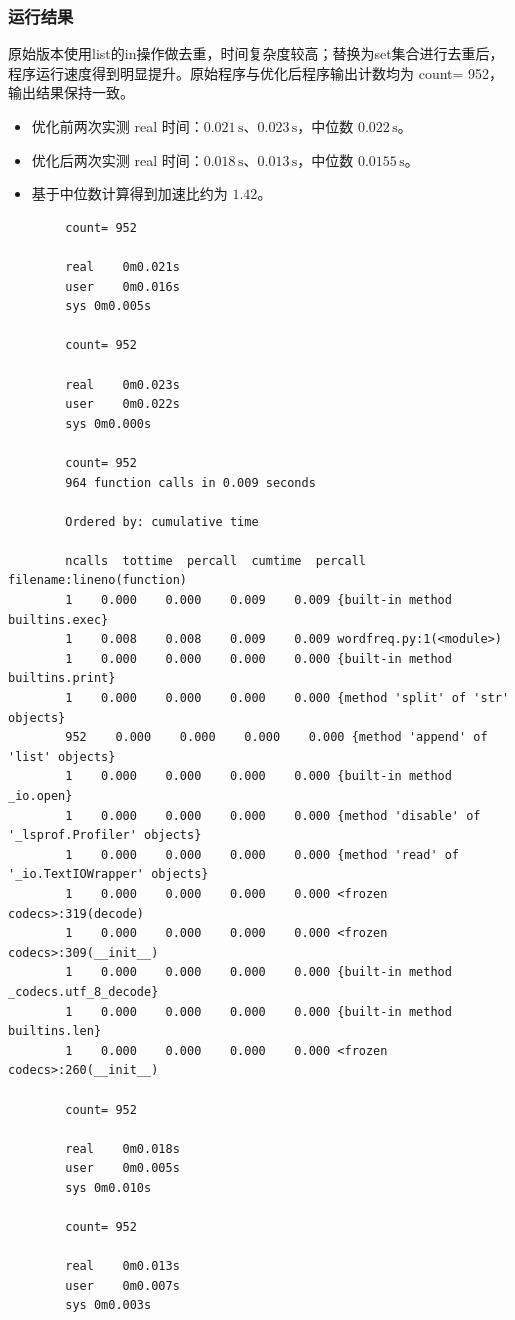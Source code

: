 \documentclass[a4paper,12pt]{ctexart}
\begin{document}
	\subsubsection{运行结果}
	 原始版本使用list的in操作做去重，时间复杂度较高；替换为set集合进行去重后，程序运行速度得到明显提升。原始程序与优化后程序输出计数均为 count= 952，输出结果保持一致。
	
	\begin{itemize}
		\item 优化前两次实测 real 时间：$0.021\,\text{s}$、$0.023\,\text{s}$，中位数 $0.022\,\text{s}$。
		\item 优化后两次实测 real 时间：$0.018\,\text{s}$、$0.013\,\text{s}$，中位数 $0.0155\,\text{s}$。
		\item 基于中位数计算得到加速比约为 $1.42$。
	\end{itemize}
	\begin{lstlisting}
		count= 952
		
		real	0m0.021s
		user	0m0.016s
		sys	0m0.005s
		
		count= 952
		
		real	0m0.023s
		user	0m0.022s
		sys	0m0.000s
		
		count= 952
		964 function calls in 0.009 seconds
		
		Ordered by: cumulative time
		
		ncalls  tottime  percall  cumtime  percall filename:lineno(function)
		1    0.000    0.000    0.009    0.009 {built-in method builtins.exec}
		1    0.008    0.008    0.009    0.009 wordfreq.py:1(<module>)
		1    0.000    0.000    0.000    0.000 {built-in method builtins.print}
		1    0.000    0.000    0.000    0.000 {method 'split' of 'str' objects}
		952    0.000    0.000    0.000    0.000 {method 'append' of 'list' objects}
		1    0.000    0.000    0.000    0.000 {built-in method _io.open}
		1    0.000    0.000    0.000    0.000 {method 'disable' of '_lsprof.Profiler' objects}
		1    0.000    0.000    0.000    0.000 {method 'read' of '_io.TextIOWrapper' objects}
		1    0.000    0.000    0.000    0.000 <frozen codecs>:319(decode)
		1    0.000    0.000    0.000    0.000 <frozen codecs>:309(__init__)
		1    0.000    0.000    0.000    0.000 {built-in method _codecs.utf_8_decode}
		1    0.000    0.000    0.000    0.000 {built-in method builtins.len}
		1    0.000    0.000    0.000    0.000 <frozen codecs>:260(__init__)
		
		count= 952
		
		real	0m0.018s
		user	0m0.005s
		sys	0m0.010s
		
		count= 952
		
		real	0m0.013s
		user	0m0.007s
		sys	0m0.003s
	\end{lstlisting}
	
\end{document}
